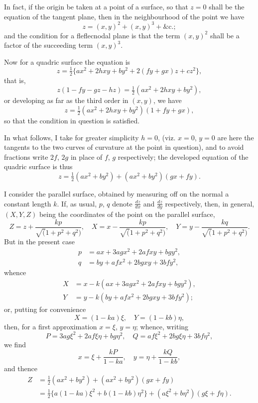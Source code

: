 \documentclass[12pt,a4paper]{article}
\theoremstyle{cayley}
\theoremstyle{definition}
\numberwithin{equation}{section}
\begin{document}
In fact, if the origin be taken at a point of a surface, so that $z = 0$ shall be the equation of the tangent plane, then in the neighbourhood of the point we have
\[
z = (x,y)^2 + (x,y)^3 + \text{\&c.};
\]
and the condition for a fleflecnodal plane is that the term $(x,y)^2$ shall be a factor of the succeeding term $(x,y)^3$.

Now for a quadric surface the equation is
\[
z = \tfrac{1}{2}\{ax^2 + 2hxy + by^2 + 2(fy + gx)z + cz^2\},
\]
that is,
\[
z(1 - fy - gz - hz) = \tfrac{1}{2}(ax^2 + 2hxy + by^2),
\]
or developing as far as the third order in $(x, y)$, we have
\[
z = \tfrac{1}{2}(ax^2 + 2hxy + by^2)(1 + fy + gx),
\]
so that the condition in question is satisfied.

In what follows, I take for greater simplicity $h = 0$, (viz. $x = 0$, $y = 0$ are here the tangents to the two curves of curvature at the point in question), and to avoid fractions write $2f$, $2g$ in place of $f$, $g$ respectively; the developed equation of the quadric surface is thus
\[
z = \tfrac{1}{2}(ax^2 + by^2) + (ax^2 + by^2)(gx + fy).
\]

I consider the parallel surface, obtained by measuring off on the normal a constant length $k$. If, as usual, $p$, $q$ denote $\frac{dz}{dx}$ and $\frac{dz}{dy}$ respectively, then, in general, $(X, Y, Z)$ being the coordinates of the point on the parallel surface,
\[
Z = z + \frac{kp}{\surd(1 + p^2 + q^2)}, \quad X = x - \frac{kp}{\surd(1 + p^2 + q^2)}, \quad Y = y - \frac{kq}{\surd(1 + p^2 + q^2)}.
\]
But in the present case
\begin{align*}
p &= ax + 3agx^2 + 2afxy + bgy^2,\\
q &= by + afx^2 + 2bgxy + 3bfy^2,
\end{align*}
whence
\begin{align*}
X &= x - k(ax + 3agx^2 + 2afxy + bgy^2),\\
Y &= y - k(by + afx^2 + 2bgxy + 3bfy^2);
\end{align*}
or, putting for convenience
\[
X = (1 - ka)\xi, \quad Y = (1 - kb)\eta,
\]
then, for a first approximation $x = \xi$, $y = \eta$; whence, writing
\[
P = 3ag\xi^2 + 2af\xi\eta + bg\eta^2, \quad Q = af\xi^2 + 2bg\xi\eta + 3bf\eta^2,
\]
we find
\[
x = \xi + \frac{kP}{1 - ka}, \quad y = \eta + \frac{kQ}{1 - kb},
\]
and thence
\begin{align*}
Z &= \tfrac{1}{2}(ax^2 + by^2) + (ax^2 + by^2)(gx + fy) \\
&= \tfrac{1}{2}\{a(1 - ka)\xi^2 + b(1 - kb)\eta^2\} + (a\xi^2 + b\eta^2)(g\xi + f\eta).
\end{align*}
\end{document}
